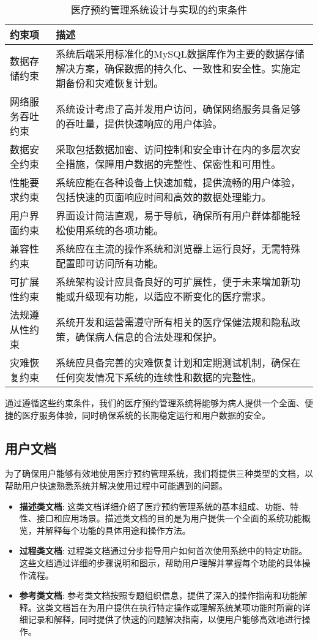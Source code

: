 \begin{table}[htbp]
	\centering
	\begin{tabular}{|l|p{10cm}|}
		\hline
		\textbf{约束项} & \textbf{描述} \\
		\hline
		数据存储约束 & 系统后端采用标准化的MySQL数据库作为主要的数据存储解决方案，确保数据的持久化、一致性和安全性。实施定期备份和灾难恢复计划。 \\
		网络服务吞吐约束 & 系统设计考虑了高并发用户访问，确保网络服务具备足够的吞吐量，提供快速响应的用户体验。 \\
		数据安全约束 & 采取包括数据加密、访问控制和安全审计在内的多层次安全措施，保障用户数据的完整性、保密性和可用性。 \\
		性能要求约束 & 系统应能在各种设备上快速加载，提供流畅的用户体验，包括快速的页面响应时间和高效的数据处理能力。 \\
		用户界面约束 & 界面设计简洁直观，易于导航，确保所有用户群体都能轻松使用系统的各项功能。 \\
		兼容性约束 & 系统应在主流的操作系统和浏览器上运行良好，无需特殊配置即可访问所有功能。 \\
		可扩展性约束 & 系统架构设计应具备良好的可扩展性，便于未来增加新功能或升级现有功能，以适应不断变化的医疗需求。 \\
		法规遵从性约束 & 系统开发和运营需遵守所有相关的医疗保健法规和隐私政策，确保病人信息的合法处理和保护。 \\
		灾难恢复约束 & 系统应具备完善的灾难恢复计划和定期测试机制，确保在任何突发情况下系统的连续性和数据的完整性。 \\
		\hline
	\end{tabular}
	\caption{医疗预约管理系统设计与实现的约束条件}
\end{table}

通过遵循这些约束条件，我们的医疗预约管理系统将能够为病人提供一个全面、便捷的医疗服务体验，同时确保系统的长期稳定运行和用户数据的安全。

\subsection{用户文档}
为了确保用户能够有效地使用医疗预约管理系统，我们将提供三种类型的文档，以帮助用户快速熟悉系统并解决使用过程中可能遇到的问题。

\begin{itemize}
	\item \textbf{描述类文档}: 这类文档详细介绍了医疗预约管理系统的基本组成、功能、特性、接口和应用场景。描述类文档的目的是为用户提供一个全面的系统功能概览，并解释每个功能的具体用途和操作方法。
	\item \textbf{过程类文档}: 过程类文档通过分步指导用户如何首次使用系统中的特定功能。这些文档通过详细的步骤说明和图示，帮助用户理解并掌握每个功能的具体操作流程。
	\item \textbf{参考类文档}: 参考类文档按照专题组织信息，提供了深入的操作指南和功能解释。这类文档旨在为用户提供在执行特定操作或理解系统某项功能时所需的详细记录和解释，同时提供了快速的问题解决指南，以便用户能够高效地进行操作。
\end{itemize}

